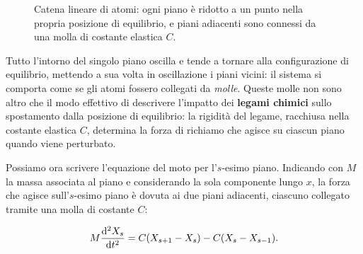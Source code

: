 \begin{figure}[htbp]
    \centering
    \caption{Catena lineare di atomi: ogni piano è ridotto a un punto nella propria posizione di equilibrio, e piani adiacenti sono connessi da una molla di costante elastica \( C \).}
    \label{fig:catena_lineare}
\end{figure}

Tutto l'intorno del singolo piano oscilla e tende a tornare alla configurazione di equilibrio, mettendo a sua volta in oscillazione i piani vicini: il sistema si comporta come se gli atomi fossero collegati da \emph{molle}. Queste molle non sono altro che il modo effettivo di descrivere l'impatto dei \textbf{legami chimici} sullo spostamento dalla posizione di equilibrio: la rigidità del legame, racchiusa nella costante elastica \( C \), determina la forza di richiamo che agisce su ciascun piano quando viene perturbato.


Possiamo ora scrivere l'equazione del moto per l'\( s \)-esimo piano. Indicando con \( M \) la massa associata al piano e considerando la sola componente lungo \( x \), la forza che agisce sull'\( s \)-esimo piano è dovuta ai due piani adiacenti, ciascuno collegato tramite una molla di costante \( C \):

\begin{equation}
    M \dv[2]{X_s}{t} = C (X_{s+1} - X_s) - C (X_s - X_{s-1}).
\end{equation}

